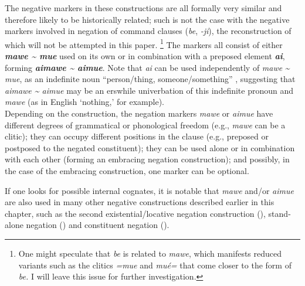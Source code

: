 \documentclass[output=paper]{langsci/langscibook}
\begin{document}
The negative markers in these constructions are all formally very similar
and therefore likely to be historically related; such is not the case with
the negative markers involved in negation of command clauses (\textit{be},
\textit{-ji}), the reconstruction of which will not be attempted in this
paper.%
%
    \footnote{One might speculate that \textit{be} is related to
    \textit{mawe}, which manifests reduced variants such as the clitics
    \textit{=mue} and \textit{mué=} that come closer to the form of
    \textit{be.} I will leave this issue for further investigation.} 
%
The markers all consist of either \textbf{\textit{mawe \textasciitilde{}
mue}} used on its own or in combination with a preposed element
\textbf{\textit{ai}}, forming \textbf{\textit{aimawe {\textasciitilde}
aimue}}. Note that \textit{ai} can be used independently of \textit{mawe}
\textit{{\textasciitilde} mue}, as an indefinite noun ``person\slash thing,
someone\slash something'' , suggesting that
\textit{aimawe {\textasciitilde} aimue} may be an erswhile univerbation of
this indefinite pronoun and \textit{mawe} (as in English `nothing,'
for example).
%
\\ 
Depending on the construction, the negation markers \textit{mawe} or
\textit{aimue} have different degrees of grammatical or phonological
freedom (e.g., \textit{mawe} can be a clitic); they can occupy different
positions in the clause (e.g., preposed or postposed to the negated constituent); they can be used alone or in combination with each other (forming an embracing negation construction); and possibly, in the case of the embracing construction, one marker can be optional.

If one looks for possible internal cognates, it is notable that
\textit{mawe} and\slash or \textit{aimue} are also used in many other
negative constructions described earlier in this chapter, such as the
second existential\slash locative negation construction
(), stand-alone negation () and
constituent negation ().
\end{document}
